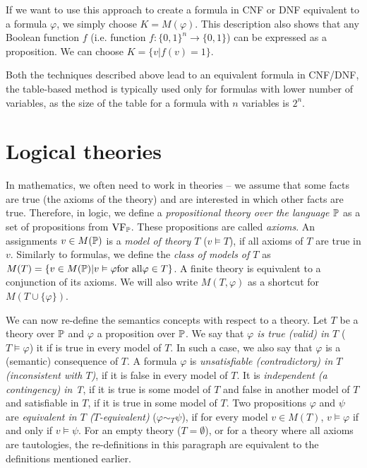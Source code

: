 If we want to use this approach to create a formula in CNF or DNF equivalent to a formula $\varphi$, we simply choose $K=M(\varphi)$. This description also shows that any Boolean function $f$ (i.e. function $f: \{0,1\}^n \to \{0,1\}$) can be expressed as a proposition. We can choose $K = \{v | f(v) = 1\}$. 

Both the techniques described above lead to an equivalent formula in CNF/DNF, the table-based method is typically used only for formulas with lower number of variables, as the size of the table for a formula with $n$ variables is $2^n$.

\section{Logical theories}

In mathematics, we often need to work in theories -- we assume that some facts are true (the axioms of the theory) and are interested in which other facts are true. Therefore, in logic, we define a \emph{propositional theory over the language $\mathbb{P}$} as a set of propositions from $\operatorname{VF}_\mathbb{P}$. These propositions are called \emph{axioms}. An assignments $v \in M(\mathbb{P})$ is a \emph{model of theory $T$} ($v \vDash T$), if all axioms of $T$ are true in $v$. Similarly to formulas, we define the \emph{class of models of $T$} as $M(T) = \{v \in M(\mathbb{P}) | v \vDash \varphi \text{for all} \varphi \in T\}$. A finite theory is equivalent to a conjunction of its axioms. We will also write $M(T, \varphi)$ as a shortcut for $M(T \cup \{\varphi\})$.

We can now re-define the semantics concepts with respect to a theory. Let $T$ be a theory over $\mathbb{P}$ and $\varphi$ a proposition over $\mathbb{P}$. We say that \emph{$\varphi$ is true (valid) in $T$} ($T\vDash \varphi$) it if is true in every model of $T$. In such a case, we also say that $\varphi$ is a (semantic) consequence of $T$. A formula $\varphi$ is \emph{unsatisfiable (contradictory) in $T$ (inconsistent with $T$)}, if it is false in every model of $T$. It is \emph{independent (a contingency) in T}, if it is true is some model of $T$ and false in another model of $T$ and satisfiable in $T$, if it is true in some model of $T$. Two propositions $\varphi$ and $\psi$ are \emph{equivalent in $T$ ($T$-equivalent)} ($\varphi \sim_T \psi$), if for every model $v \in M(T)$, $v \vDash \varphi$ if and only if $v \vDash \psi$. For an empty theory ($T = \emptyset$), or for a theory where all axioms are tautologies, the re-definitions in this paragraph are equivalent to the definitions mentioned earlier.

